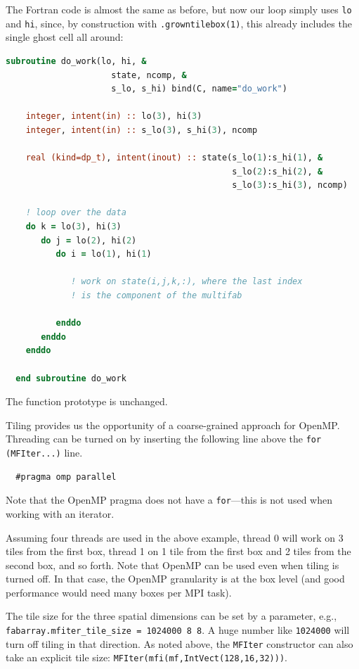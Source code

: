 The Fortran code is almost the same as before, but now our loop 
simply uses {\tt lo} and {\tt hi}, since, by construction with
{\tt .growntilebox(1)}, this already includes the single ghost cell 
all around:
\begin{lstlisting}[language=Fortran]
  subroutine do_work(lo, hi, &
                     state, ncomp, &
                     s_lo, s_hi) bind(C, name="do_work")

    integer, intent(in) :: lo(3), hi(3)
    integer, intent(in) :: s_lo(3), s_hi(3), ncomp

    real (kind=dp_t), intent(inout) :: state(s_lo(1):s_hi(1), &
                                             s_lo(2):s_hi(2), &
                                             s_lo(3):s_hi(3), ncomp)

    ! loop over the data
    do k = lo(3), hi(3)
       do j = lo(2), hi(2)
          do i = lo(1), hi(1)

             ! work on state(i,j,k,:), where the last index
             ! is the component of the multifab

          enddo
       enddo
    enddo

  end subroutine do_work
\end{lstlisting}

The function prototype is unchanged.

Tiling provides us the opportunity of a coarse-grained approach for
OpenMP.  Threading can be turned on by inserting the following line
above the {\tt for (MFIter...)} line.
\begin{lstlisting}
  #pragma omp parallel
\end{lstlisting}
Note that the OpenMP pragma does not have a {\tt for}---this is not
used when working with an iterator.

Assuming four threads are used in the above example, thread 0 will
work on 3 tiles from the first box, thread 1 on 1 tile from the first
box and 2 tiles from the second box, and so forth.  Note that
OpenMP can be used even when tiling is turned off.  In that case, the
OpenMP granularity is at the box level (and good performance would need
many boxes per MPI task).

The tile size for the three spatial dimensions can be set by a
parameter, e.g., {\tt fabarray.mfiter\_tile\_size = 1024000 8 8}.  A
huge number like {\tt 1024000} will turn off tiling in that direction.
As noted above, the {\tt MFIter} constructor can also take an explicit
tile size: {\tt MFIter(mfi(mf,IntVect(128,16,32)))}.

